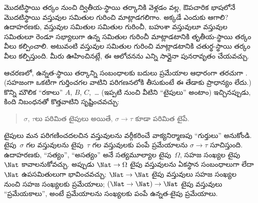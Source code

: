 \documentclass[../../../include/open-logic-section]{subfiles}
\begin{document}


మొదటిస్థాయి తర్కం నుంచి ద్వితీయ-స్థాయి తర్కానికి వెళ్లడం వల్ల,
ఔపచారిక భాషలోనే మొదటిస్థాయి  వస్తువుల సమితుల గురించి
మాట్లాడగలిగాం. అక్కడే ఎందుకు ఆగాలి? ఉదాహరణకు, వస్తువుల సమితుల
సమితుల గురించీ, బహుశా వస్తువులూ వస్తువుల సమితులూ రెండూ సభ్యాలుగా ఉన్న
సమితుల గురించీ మాట్లాడటానికి తృతీయ-స్థాయి తర్కం వీలు కల్పించాలి.
అటువంటి వస్తువుల సమితుల గురించి మాట్లాడటానికి చతుర్థ-స్థాయి తర్కం
వీలు కల్పిస్తుంది. మీరు ఊహించినట్లే, ఈ ఆలోచనను ఎన్ని సార్లైనా
పునరావృతం చేయవచ్చు.

ఆచరణలో, ఉన్నత-స్థాయి తర్కాన్ని సంబంధాలకు బదులు ప్రమేయాల ఆధారంగా
తరచుగా . (సహజంగా ఒకటిగా గుర్తించగల వాటిని
పరిగణనలోకి తీసుకుంటే ఈ తేడాకు ప్రాధాన్యం లేదు.) కొన్ని మౌలిక ``రకాలు'' $A$, $B$, $C$,~\dots
(ఇప్పటి నుంచి వీటిని ``టైపులు'' అంటాం) ఇచ్చినప్పుడు, కింది నిబంధనతో
కొత్తవాటిని సృష్టించవచ్చు:
\begin{quote}
$\sigma$, $\tau$లు పరిమిత టైపులు అయితే, $\sigma \to \tau$ కూడా పరిమిత
టైపే.
\end{quote}
టైపులు మన  పరిగణించదలచిన వస్తువులను వర్గీకరించే
వాక్యనిర్మాణపు ``గుర్తులు'' అనుకోండి. టైపు~$\sigma$ గల వస్తువులను
టైపు~$\tau$ గల వస్తువులకు పంపే ప్రమేయాలను
$\sigma \to \tau$ సూచిస్తుంది. ఉదాహరణకు, ``సత్యం'', ``అసత్యం'' అనే
సత్యమూల్యాల టైపు~$\Omega$, సహజ సంఖ్యల టైపు~$\Nat$ కావాలనుకోవచ్చు.
అప్పుడు $\Nat \to \Omega$ టైపు వస్తువులను ఏకస్థాన సంబంధాలుగా లేదా
$\Nat$ ఉపసమితులుగా భావించవచ్చు; $\Nat \to \Nat$ టైపు వస్తువులు సహజ
సంఖ్యల నుంచి సహజ సంఖ్యలకు ప్రమేయాలు; $(\Nat \to \Nat) \to \Nat$
టైపు వస్తువులు ``ప్రమేయకాలు'', అంటే ప్రమేయాలను సంఖ్యలకు పంపే
ఉన్నత-టైపు ప్రమేయాలు.
\end{document}
